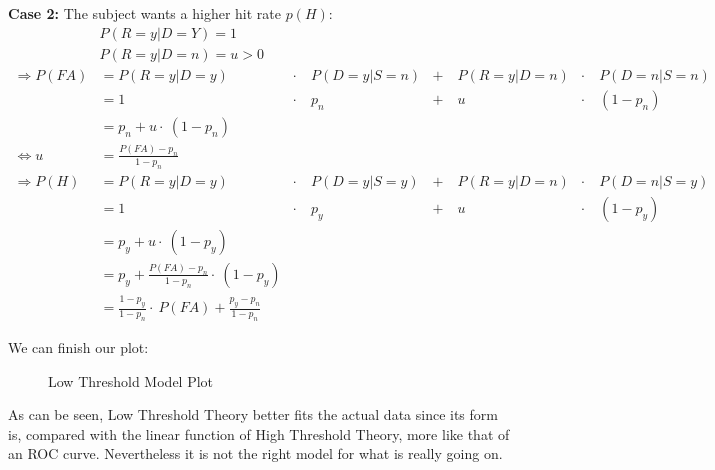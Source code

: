 \documentclass[../main/Notes.tex]{subfiles}
\begin{document}
\textbf{Case 2:} The subject wants a higher hit rate $p(H)$:
\begin{align*}
& P\left(R=y|D=Y\right) = 1 \\
& P\left(R=y|D=n\right) = u > 0\\
\Rightarrow P(FA) & = P\left(R=y|D=y\right) &\cdot~& P\left(D=y|S=n\right) &+~&P\left(R=y|D=n\right)&\cdot~ & P\left(D=n|S=n\right) \\
& = 1 &\cdot~& p_{n} &+~& u &\cdot~& \left(1-p_{n}\right) \\
& = p_{n} + u \cdot~ \left(1-p_{n}\right)\\
\Leftrightarrow u &= \frac{P(FA)-p_{n}}{1-p_{n}} \\
\Rightarrow P(H) & = P\left(R=y|D=y\right) &\cdot~& P\left(D=y|S=y\right) &+~&P\left(R=y|D=n\right)&\cdot~ & P\left(D=n|S=y\right) \\
& = 1 &\cdot~& p_{y} &+~& u &\cdot~& \left(1-p_{y}\right) \\
& = p_{y} +  u \cdot~  \left(1-p_{y}\right)\\
& = p_{y} +  \frac{P(FA)-p_{n}}{1-p_{n}} \cdot~  \left( 1-p_{y} \right)\\
& = \frac{1-p_{y}}{1-p_{n}} \cdot~ P(FA) + \frac{p_{y}-p_{n}}{1-p_{n}}
\end{align*}

We can finish our plot:
\begin{figure}[ht!]
  \centering
  \caption{Low Threshold Model Plot}
  \label{fig:2014-06-27_LowThrshPlot}
\end{figure}

As can be seen, Low Threshold Theory better fits the actual data since its form is, compared with the linear function of High Threshold Theory, more like that of an ROC curve. Nevertheless it is not the right model for what is really going on.
\end{document}
